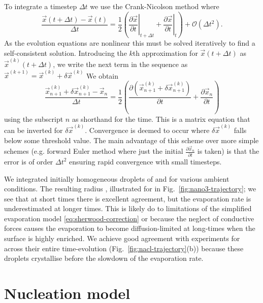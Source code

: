 \documentclass[11pt,twoside]{report}
\begin{document}
To integrate a timestep $\Delta t$ we use the Crank-Nicolson \cite{CrankMPCPS1947} method where
\begin{equation*}
  \frac{\vec{x}(t + \Delta t) - \vec{x}(t)}{\Delta t}
  =
  \frac{1}{2}
  \left(
  \left. \frac{\partial \vec{x}}{\partial t} \right|_{t + \Delta t}
  +
  \left. \frac{\partial \vec{x}}{\partial t} \right|_t
  \right)
  + \mathcal{O}(\Delta t^2).
\end{equation*}
As the evolution equations are nonlinear this must be solved iteratively to find a self-consistent solution.
Introducing the $k$th approximation for $\vec{x}(t + \Delta t)$ as $\vec{x}^{(k)}(t + \Delta t)$, we write the next term in the sequence as $\vec{x}^{(k+1)} = \vec{x}^{(k)} + \delta \vec{x}^{(k)}$
We obtain
\begin{equation*}
  \frac{\vec{x}_{n+1}^{(k)} + \delta\vec{x}_{n+1}^{(k)} - \vec{x}_n}{\Delta t}
  =
  \frac{1}{2}
  \left(
  \frac{\partial (\vec{x}_{n+1}^{(k)} + \delta\vec{x}_{n+1}^{(k)})}{\partial t}
  +
  \frac{\partial \vec{x}_n}{\partial t}
  \right)
\end{equation*}
using the subscript $n$ as shorthand for the time.
This is a matrix equation that can be inverted for $\delta \vec{x}^{(k)}$.
Convergence is deemed to occur where $\delta \vec{x}^{(k)}$ falls below some threshold value.
The main advantage of this scheme over more simple schemes (e.g. forward Euler method where just the initial $\frac{\partial \vec{x}_n}{\partial t}$ is taken) is that the error is of order $\Delta t^2$ ensuring rapid convergence with small timesteps.

We integrated initially homogeneous droplets of  and  for various ambient conditions.
The resulting radius , illustrated for  in Fig.\ \ref{fig:nano3-trajectory}; we see that at short times there is excellent agreement, but the evaporation rate is underestimated at longer times.
This is likely do to limitations of the simplified evaporation model \eqref{eq:sherwood-correction} or because the neglect of conductive forces causes the evaporation to become diffusion-limited at long-times when the surface is highly enriched.
We achieve good agreement with experiments for  across their entire time-evolution (Fig.\ \ref{fig:nacl-trajectory}(b)) because these droplets crystallise before the slowdown of the evaporation rate.

\section{Nucleation model}
\label{sec:nucleation}
\end{document}
